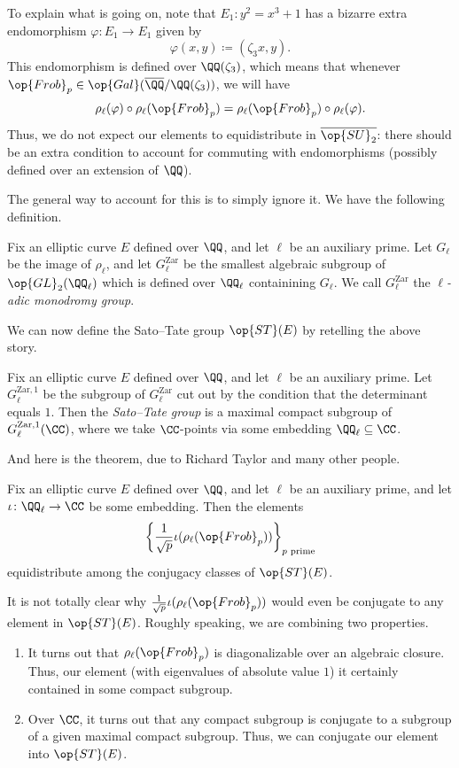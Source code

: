 \documentclass{article}
\begin{document}
To explain what is going on, note that $E_1\colon y^2=x^3+1$ has a bizarre extra endomorphism $\varphi\colon E_1\to E_1$ given by
\[\varphi(x,y)\coloneqq(\zeta_3x,y).\]
This endomorphism is defined over $\QQ(\zeta_3)$, which means that whenever ${\op{Frob}_p}\in\op{Gal}(\overline\QQ/\QQ(\zeta_3))$, we will have
\[\rho_\ell(\varphi)\circ\rho_\ell({\op{Frob}_p})=\rho_\ell({\op{Frob}_p})\circ\rho_\ell(\varphi).\]
Thus, we do not expect our elements to equidistribute in $\overline{\op{SU}_2}$: there should be an extra condition to account for commuting with endomorphisms (possibly defined over an extension of $\QQ$).

The general way to account for this is to simply ignore it. We have the following definition.
\begin{definition}
	Fix an elliptic curve $E$ defined over $\QQ$, and let $\ell$ be an auxiliary prime. Let $G_\ell$ be the image of $\rho_\ell$, and let $G_\ell^{\mathrm{Zar}}$ be the smallest algebraic subgroup of $\op{GL}_{2}(\QQ_\ell)$ which is defined over $\QQ_\ell$ containining $G_\ell$. We call $G_\ell^{\mathrm{Zar}}$ the \textit{$\ell$-adic monodromy group}.
\end{definition}
We can now define the Sato--Tate group $\op{ST}(E)$ by retelling the above story.
\begin{definition}
	Fix an elliptic curve $E$ defined over $\QQ$, and let $\ell$ be an auxiliary prime. Let $G_\ell^{\mathrm{Zar},1}$ be the subgroup of $G_\ell^{\mathrm{Zar}}$ cut out by the condition that the determinant equals $1$. Then the \textit{Sato--Tate group} is a maximal compact subgroup of $G_\ell^{\mathrm{Zar},1}(\CC)$, where we take $\CC$-points via some embedding $\QQ_\ell\subseteq\CC$.
\end{definition}
And here is the theorem, due to Richard Taylor and many other people.
\begin{theorem} \label{thm:st-ec}
	Fix an elliptic curve $E$ defined over $\QQ$, and let $\ell$ be an auxiliary prime, and let $\iota\colon\QQ_\ell\to\CC$ be some embedding. Then the elements
	\[\left\{\frac1{\sqrt p}\iota(\rho_\ell({\op{Frob}_p}))\right\}_{p\text{ prime}}\]
	equidistribute among the conjugacy classes of $\op{ST}(E)$.
\end{theorem}
\begin{remark} \label{rem:why-in-st}
	It is not totally clear why $\frac1{\sqrt p}\iota(\rho_\ell({\op{Frob}_p}))$ would even be conjugate to any element in $\op{ST}(E)$. Roughly speaking, we are combining two properties.
	\begin{enumerate}
		\item It turns out that $\rho_\ell({\op{Frob}_p})$ is diagonalizable over an algebraic closure. Thus, our element (with eigenvalues of absolute value $1$) it certainly contained in some compact subgroup.
		\item Over $\CC$, it turns out that any compact subgroup is conjugate to a subgroup of a given maximal compact subgroup. Thus, we can conjugate our element into $\op{ST}(E)$.
	\end{enumerate}
\end{remark}
\end{document}
